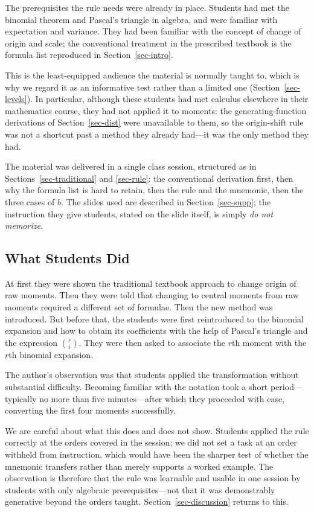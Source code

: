 \documentclass[
  12pt]{article}
\begin{document}
The prerequisites the rule needs were already in place. Students had met the binomial theorem and Pascal's triangle in algebra, and were familiar with expectation and variance. They had been familiar with the concept of change of origin and scale; the conventional treatment in the prescribed textbook is the formula list reproduced in Section~\ref{sec-intro}.

This is the least-equipped audience the material is normally taught to, which is why we regard it as an informative test rather than a limited one (Section~\ref{sec-levels}). In particular, although these students had met calculus elsewhere in their mathematics course, they had not applied it to moments: the generating-function derivations of Section~\ref{sec-dist} were unavailable to them, so the origin-shift rule was not a shortcut past a method they already had---it was the only method they had.

The material was delivered in a single class session, structured as in Sections~\ref{sec-traditional} and \ref{sec-rule}: the conventional derivation first, then why the formula list is hard to retain, then the rule and the mnemonic, then the three cases of $b$. The slides used are described in Section~\ref{sec-supp}; the instruction they give students, stated on the slide itself, is simply \emph{do not memorize}.

\subsection{What Students Did}

At first they were shown the traditional textbook approach to change origin of raw moments. Then they were told that changing to central moments from raw moments required a different set of formulae. Then the new method was introduced. But before that, the students were first reintroduced to the binomial expansion and how to obtain its coefficients with the help of Pascal's triangle and the expression $\binom{r}{i}$. They were then asked to associate the $r$th moment with the $r$th binomial expansion.

The author's observation was that students applied the transformation without substantial difficulty. Becoming familiar with the notation took a short period---typically no more than five minutes---after which they proceeded with ease, converting the first four moments successfully.

We are careful about what this does and does not show. Students applied the rule correctly at the orders covered in the session; we did not set a task at an order withheld from instruction, which would have been the sharper test of whether the mnemonic transfers rather than merely supports a worked example. The observation is therefore that the rule was learnable and usable in one session by students with only algebraic prerequisites---not that it was demonstrably generative beyond the orders taught. Section~\ref{sec-discussion} returns to this.
\end{document}
